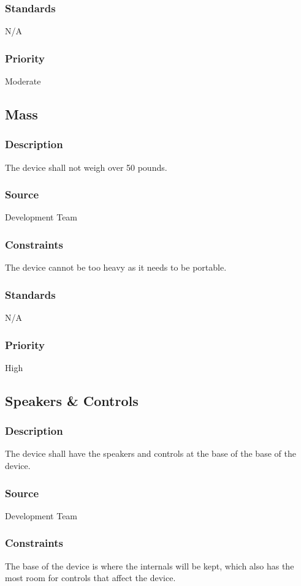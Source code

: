 \subsubsection{Standards}
N/A
\subsubsection{Priority}
Moderate

\subsection{Mass}
\subsubsection{Description}
The device shall not weigh over 50 pounds.
\subsubsection{Source}
Development Team
\subsubsection{Constraints}
The device cannot be too heavy as it needs to be portable.
\subsubsection{Standards}
N/A
\subsubsection{Priority}
High

\subsection{Speakers & Controls}
\subsubsection{Description}
The device shall have the speakers and controls at the base of the base of the device.
\subsubsection{Source}
Development Team
\subsubsection{Constraints}
The base of the device is where the internals will be kept, which also has the most room for controls that affect the device.
